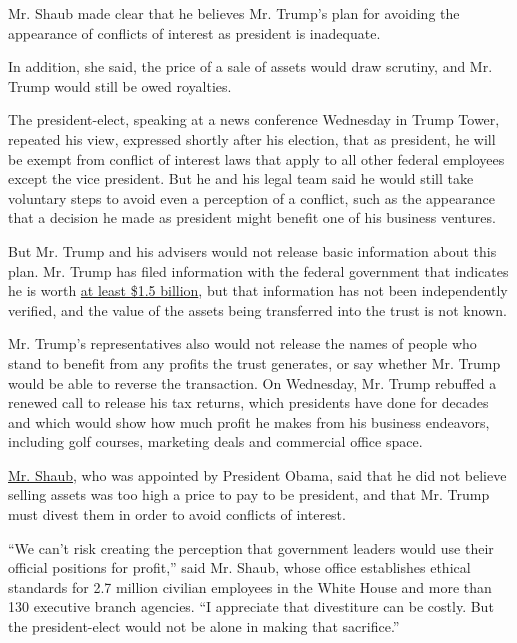 Mr. Shaub made clear that he believes Mr. Trump's plan for avoiding the
appearance of conflicts of interest as president is inadequate.

In addition, she said, the price of a sale of assets would draw
scrutiny, and Mr. Trump would still be owed royalties.

The president-elect, speaking at a news conference Wednesday in Trump
Tower, repeated his view, expressed shortly after his election, that as
president, he will be exempt from conflict of interest laws that apply
to all other federal employees except the vice president. But he and his
legal team said he would still take voluntary steps to avoid even a
perception of a conflict, such as the appearance that a decision he made
as president might benefit one of his business ventures.

But Mr. Trump and his advisers would not release basic information about
this plan. Mr. Trump has filed information with the federal government
that indicates he is worth
\href{http://www.nytimes.com/2016/05/19/us/politics/donald-trump-money.html}{at
least \$1.5 billion}, but that information has not been independently
verified, and the value of the assets being transferred into the trust
is not known.

Mr. Trump's representatives also would not release the names of people
who stand to benefit from any profits the trust generates, or say
whether Mr. Trump would be able to reverse the transaction. On
Wednesday, Mr. Trump rebuffed a renewed call to release his tax returns,
which presidents have done for decades and which would show how much
profit he makes from his business endeavors, including golf courses,
marketing deals and commercial office space.

\href{https://www.oge.gov/Web/OGE.nsf/Organization/Senior\%20Leadership}{Mr.
Shaub}, who was appointed by President Obama, said that he did not
believe selling assets was too high a price to pay to be president, and
that Mr. Trump must divest them in order to avoid conflicts of interest.

``We can't risk creating the perception that government leaders would
use their official positions for profit,'' said Mr. Shaub, whose office
establishes ethical standards for 2.7 million civilian employees in the
White House and more than 130 executive branch agencies. ``I appreciate
that divestiture can be costly. But the president-elect would not be
alone in making that sacrifice.''

\href{https://www.nytimes.com/interactive/2016/12/01/us/politics/trump-conflict-of-interests.html}{}

